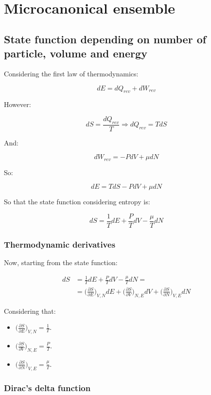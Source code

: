 \chapter{Microcanonical ensemble}

\section{State function depending on number of particle, volume and energy}
Considering the first law of thermodynamics:

$$dE = dQ_{rev} + dW_{rev}$$

However:

$$dS = \frac{dQ_{rev}}{T}\Rightarrow dQ_{rev} = TdS$$

And:

$$dW_{rev} = -PdV + \mu dN$$

So:

$$dE = TdS - PdV + \mu dN$$

So that the state function considering entropy is:

$$dS = \frac{1}{T}dE + \frac{P}{T}dV - \frac{\mu}{T}dN$$

	\subsection{Thermodynamic derivatives}
	Now, starting from the state function:

	\begin{align*}
		dS &= \frac{1}{T}dE + \frac{P}{T}dV - \frac{\mu}{T}dN = \\
			 &= \biggl(\frac{\partial S}{\partial E}\biggr)_{V, N}dE +\biggl(\frac{\partial S}{\partial V}\biggr)_{N, E} dV + \biggl(\frac{\partial S}{\partial N}\biggr)_{V, E}dN
	\end{align*}

	Considering that:

	\begin{multicols}{3}
		\begin{itemize}
			\item $\biggl(\frac{\partial S}{\partial E}\biggr)_{V, N} = \frac{1}{T}$.
			\item $\biggl(\frac{\partial S}{\partial V}\biggr)_{N, E} = \frac{P}{T}$.
			\item $\biggl(\frac{\partial S}{\partial N}\biggr)_{V, E} = \frac{\mu}{T}$.
		\end{itemize}
	\end{multicols}

	\subsection{Dirac's delta function}

